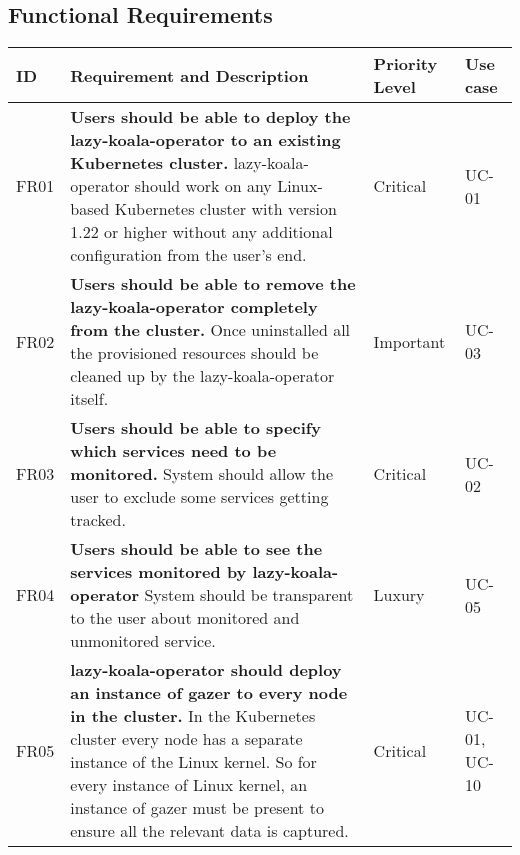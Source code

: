 
\newcommand{\functionalRequirement}[5]{
    #1 &
    \textbf{#2} \newline #3 &
    #4 &
    #5  \\ \hline
}

\subsection{Functional Requirements}

\begin{longtable}{|p{9mm}|p{107mm}|p{16mm}|p{13mm}|}
\hline
    \textbf{ID} &
    \textbf{Requirement and Description} &
    \textbf{Priority Level} &
    \textbf{Use case} \\ \hline


    \functionalRequirement
    {FR01}
    {Users should be able to deploy the \ac{lazy-koala-operator} to an existing Kubernetes cluster.}
    {\ac{lazy-koala-operator} should work on any Linux-based Kubernetes cluster with version 1.22 or higher without any additional configuration from the user's end.}
    {Critical}
    {UC-01}
    
    \functionalRequirement
    {FR02}
    {Users should be able to remove the \ac{lazy-koala-operator} completely from the cluster.}
    {Once uninstalled all the provisioned resources should be cleaned up by the \ac{lazy-koala-operator} itself. }
    {Important}
    {UC-03}
    
        
    \functionalRequirement
    {FR03}
    {Users should be able to specify which services need to be monitored.}
    {System should allow the user to exclude some services getting tracked.}
    {Critical}
    {UC-02}
    
        
    \functionalRequirement
    {FR04}
    {Users should be able to see the services monitored by \ac{lazy-koala-operator}}
    {System should be transparent to the user about monitored and unmonitored service.}
    {Luxury}
    {UC-05}
    
        
    \functionalRequirement
    {FR05}
    {\ac{lazy-koala-operator} should deploy an instance of \ac{gazer} to every node in the cluster.}
    {In the Kubernetes cluster every node has a separate instance of the Linux kernel. So for every instance of Linux kernel, an instance of \ac{gazer} must be present to ensure all the relevant data is captured.}
    {Critical}
    {UC-01, UC-10}
    

\end{longtable}
